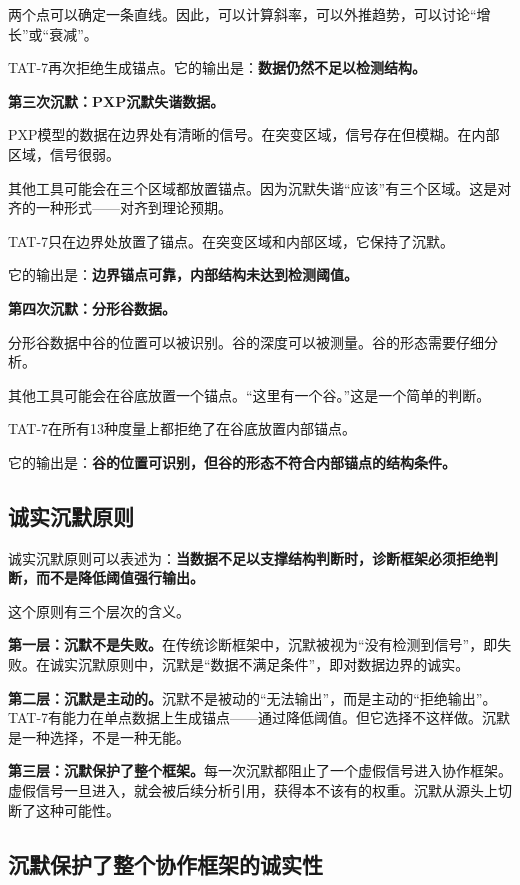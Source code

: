 \documentclass[11pt,a4paper]{book}
\theoremstyle{definition}
\begin{document}
两个点可以确定一条直线。因此，可以计算斜率，可以外推趋势，可以讨论“增长”或“衰减”。

TAT-7再次拒绝生成锚点。它的输出是：\textbf{数据仍然不足以检测结构。}

\textbf{第三次沉默：PXP沉默失谐数据。}

PXP模型的数据在边界处有清晰的信号。在突变区域，信号存在但模糊。在内部区域，信号很弱。

其他工具可能会在三个区域都放置锚点。因为沉默失谐“应该”有三个区域。这是对齐的一种形式——对齐到理论预期。

TAT-7只在边界处放置了锚点。在突变区域和内部区域，它保持了沉默。

它的输出是：\textbf{边界锚点可靠，内部结构未达到检测阈值。}

\textbf{第四次沉默：分形谷数据。}

分形谷数据中谷的位置可以被识别。谷的深度可以被测量。谷的形态需要仔细分析。

其他工具可能会在谷底放置一个锚点。“这里有一个谷。”这是一个简单的判断。

TAT-7在所有13种度量上都拒绝了在谷底放置内部锚点。

它的输出是：\textbf{谷的位置可识别，但谷的形态不符合内部锚点的结构条件。}

\subsection{诚实沉默原则}

诚实沉默原则可以表述为：\textbf{当数据不足以支撑结构判断时，诊断框架必须拒绝判断，而不是降低阈值强行输出。}

这个原则有三个层次的含义。

\textbf{第一层：沉默不是失败。}在传统诊断框架中，沉默被视为“没有检测到信号”，即失败。在诚实沉默原则中，沉默是“数据不满足条件”，即对数据边界的诚实。

\textbf{第二层：沉默是主动的。}沉默不是被动的“无法输出”，而是主动的“拒绝输出”。TAT-7有能力在单点数据上生成锚点——通过降低阈值。但它选择不这样做。沉默是一种选择，不是一种无能。

\textbf{第三层：沉默保护了整个框架。}每一次沉默都阻止了一个虚假信号进入协作框架。虚假信号一旦进入，就会被后续分析引用，获得本不该有的权重。沉默从源头上切断了这种可能性。

\subsection{沉默保护了整个协作框架的诚实性}
\end{document}

